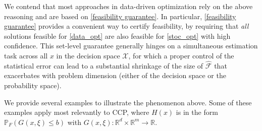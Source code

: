 \documentclass[mnsc,blindrev]{informs4} %
\begin{document}


We contend that most approaches in data-driven optimization rely on the above reasoning and are based on \eqref{feasibility guarantee}. In particular, \eqref{feasibility guarantee} provides a convenient way to certify feasibility, by requiring that \emph{all} solutions feasible for \eqref{data_opt} are also feasible for \eqref{stoc_opt} with high confidence. This set-level guarantee generally hinges on a simultaneous estimation task across all $x$ in the decision space $\mathcal X$, for which a proper control of the statistical error can lead to a substantial shrinkage of the size of $\hat{\mathcal F}$ that exacerbates with problem dimension (either of the decision space or the probability space).





We provide several examples to illustrate the phenomenon above. Some of these examples apply most relevantly to CCP, where $H(x)$ is in the form $\mathbb P_F(G(x,\xi)\leq b)$ with $G(x,\xi):\mathbb R^d\times\mathbb R^m\to\mathbb R$.

\end{document}
